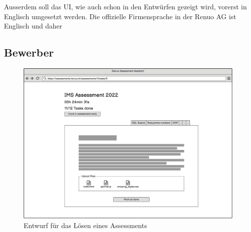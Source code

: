 Ausserdem soll das UI, wie auch schon in den Entwürfen gezeigt wird, vorerst in Englisch umgesetzt werden. Die offizielle Firmensprache
in der Renuo AG ist Englisch und daher 

\subsection{Bewerber}
\begin{figure}[H]
    \centering
    \includegraphics[width=12cm]{images/mockups/candidate-solve-assessment.png}

    \caption{\label{fig:mockup-candidate-solve-assessment}Entwurf für das Lösen eines Assessments}
\end{figure}


